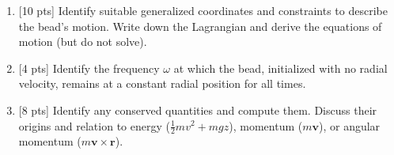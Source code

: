 \documentclass{jhwhw}
\begin{document}
\begin{enumerate}
  \item {[10 pts]} Identify suitable generalized coordinates and constraints to describe the bead's motion. Write down the Lagrangian and derive the equations of motion (but do not solve).
  \item {[4 pts]} Identify the frequency $\omega$ at which the bead, initialized with no radial velocity, remains at a constant radial position for all times.
  \item {[8 pts]} Identify any conserved quantities and compute them. Discuss their origins and relation to energy ($\frac12 m v^{2} + m g z$), momentum ($m \mathbf v$), or angular momentum ($m \mathbf v \times \mathbf r$).
\end{enumerate}
\end{document}
